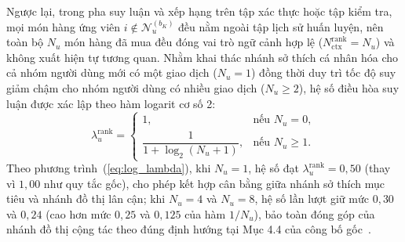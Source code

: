 \documentclass{llncs}
\begin{document}
Ngược lại, trong pha suy luận và xếp hạng trên tập xác thực hoặc tập kiểm tra, mọi món hàng ứng viên $i \notin \mathcal{N}_u^{(b_K)}$ đều nằm ngoài tập lịch sử huấn luyện, nên toàn bộ $N_u$ món hàng đã mua đều đóng vai trò ngữ cảnh hợp lệ ($N_{\mathrm{ctx}}^{\mathrm{rank}} = N_u$) và không xuất hiện tự tương quan. Nhằm khai thác nhánh sở thích cá nhân hóa cho cả nhóm người dùng mới có một giao dịch ($N_u = 1$) đồng thời duy trì tốc độ suy giảm chậm cho nhóm người dùng có nhiều giao dịch ($N_u \ge 2$), hệ số điều hòa suy luận được xác lập theo hàm logarit cơ số 2:
\begin{equation}
\lambda_u^{\mathrm{rank}} = \begin{cases}
1, & \text{nếu } N_u = 0, \\
\dfrac{1}{1 + \log_2(N_u + 1)}, & \text{nếu } N_u \ge 1.
\end{cases}
\label{eq:log_lambda}
\end{equation}
Theo phương trình~(\ref{eq:log_lambda}), khi $N_u = 1$, hệ số đạt $\lambda_u^{\mathrm{rank}} = 0{,}50$ (thay vì $1{,}00$ như quy tắc gốc), cho phép kết hợp cân bằng giữa nhánh sở thích mục tiêu và nhánh đồ thị lân cận; khi $N_u = 4$ và $N_u = 8$, hệ số lần lượt giữ mức $0{,}30$ và $0{,}24$ (cao hơn mức $0{,}25$ và $0{,}125$ của hàm $1/N_u$), bảo toàn đóng góp của nhánh đồ thị cộng tác theo đúng định hướng tại Mục 4.4 của công bố gốc~\cite{yan2024bipn}.
\end{document}
